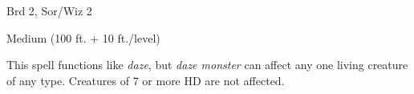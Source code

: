 
\begin{description*}
\item[Level:] Brd 2, Sor/Wiz 2
\item[Range:] Medium (100 ft. + 10 ft./level)
\end{description*}

This spell functions like \textit{daze}, but \textit{daze monster} can affect any
one living creature of any type. Creatures of 7 or more HD are not affected.